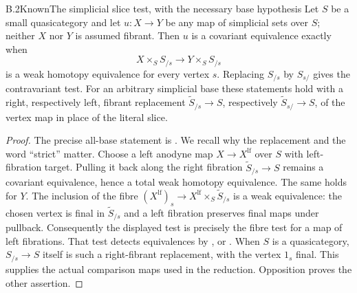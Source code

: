 \begin{claim}{B.2}{Known}{The simplicial slice test, with the necessary base hypothesis}
Let $S$ be a small quasicategory and let $u:X\to Y$ be any map of simplicial
sets over $S$; neither $X$ nor $Y$ is assumed fibrant. Then $u$ is a covariant
equivalence exactly when
\[
 X\times_S S_{/s}\longrightarrow Y\times_S S_{/s}
\]
is a weak homotopy equivalence for every vertex $s$. Replacing $S_{/s}$ by
$S_{s/}$ gives the contravariant test. For an arbitrary simplicial base these
statements hold with a right, respectively left, fibrant replacement
$\widetilde S_{/s}\to S$, respectively $\widetilde S_{s/}\to S$, of the
vertex map in place of the literal slice.
\end{claim}
\begin{proof}
The precise all-base statement is \citet[4.4.29--4.4.30]{BCCisinski2019}.
We recall why the replacement and the word ``strict'' matter. Choose a left
anodyne map $X\to X^{\mathrm{lf}}$ over $S$ with left-fibration target.
Pulling it back along the right fibration $\widetilde S_{/s}\to S$ remains
a covariant equivalence, hence a total weak homotopy equivalence. The same
holds for $Y$. The inclusion of the fibre
$(X^{\mathrm{lf}})_s\to X^{\mathrm{lf}}\times_S\widetilde S_{/s}$ is a
weak equivalence: the chosen vertex is final in $\widetilde S_{/s}$ and a
left fibration preserves final maps under pullback. Consequently the displayed
test is precisely the fibre test for a map of left fibrations. That test detects
equivalences by \citet[Theorem 4.4.14]{BCCisinski2019}, or
\citet[Theorem 2.2.1.2 and Corollary 2.2.3.12]{DGLurieHTT}.
When $S$ is a quasicategory, $S_{/s}\to S$ itself is such a right-fibrant
replacement, with the vertex $1_s$ final. This supplies the actual comparison
maps used in the reduction. Opposition proves the other assertion.
\end{proof}

